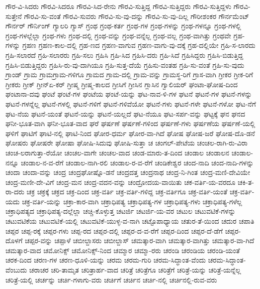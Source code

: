 {ಗೌರ-ವಿ-ಸಿದರು
ಗೌರವಿ-ಸಿದರೂ
ಗೌರವಿ-ಸಿದ-ರೇನು
ಗೌರವಿ-ಸುತ್ತಿದ್ದ
ಗೌರವಿ-ಸುತ್ತಿದ್ದರು
ಗೌರವಿ-ಸುತ್ತಿದ್ದಳು
ಗೌರವಿ-ಸುತ್ತೇನೆ
ಗೌರವಿ-ಸು-ವಂತೆ
ಗೌರವಿ-ಸುವರು
ಗೌರವಿ-ಸು-ವು-ದನ್ನು
ಗೌರವಿ-ಸು-ವು-ದಿಲ್ಲ
ಗೌರೀಶಂಕರ
ಗೌರ್ನಮೆಂಟ್
ಗೌರ್ನರ್
ಗೌರ್ನಿಂಗ್
ಗ್ಯಾಲರಿ
ಗ್ಯಾಸ್
ಗ್ರಂಥ
ಗ್ರಂಥ-ಕರ್ತ
ಗ್ರಂಥ-ಗಳ
ಗ್ರಂಥ-ಗಳನ್ನು
ಗ್ರಂಥ-ಗಳನ್ನೂ
ಗ್ರಂಥ-ಗಳಲ್ಲಿ
ಗ್ರಂಥ-ಗಳಲ್ಲೆಲ್ಲಾ
ಗ್ರಂಥ-ಗಳು
ಗ್ರಂಥ-ದಲ್ಲಿ
ಗ್ರಂಥ-ವನ್ನು
ಗ್ರಂಥ-ವನ್ನೆಲ್ಲ
ಗ್ರಂಥ-ವಲ್ಲ
ಗ್ರಂಥ-ವಾಗಿತ್ತು
ಗ್ರಂಥವೇ
ಗ್ರಹ-ಗಳನ್ನು
ಗ್ರಹಣ
ಗ್ರಹಣ-ಕಾಲ-ದಲ್ಲಿ
ಗ್ರಹ-ಣದ
ಗ್ರಹಣ-ವಾಗುವ
ಗ್ರಹಣ-ವಾಗು-ವು-ದಕ್ಕೆ
ಗ್ರಹ-ದಲ್ಲಿಯೇ
ಗ್ರಹಿ-ಸ-ಲಾರದು
ಗ್ರಹಿ-ಸಲಾರದೆ
ಗ್ರಹಿ-ಸಲಾರರು
ಗ್ರಹಿ-ಸಲು
ಗ್ರಹಿಸಿ
ಗ್ರಹಿ-ಸಿದ
ಗ್ರಹಿಸಿ-ದರು
ಗ್ರಹಿ-ಸಿದೆ
ಗ್ರಹಿಸಿದ್ದರು
ಗ್ರಹಿಸಿ-ಬಿಡುತ್ತಿದ್ದ
ಗ್ರಹಿಸಿ-ಬಿಡುತ್ತಿದ್ದರು
ಗ್ರಹಿಸಿ-ರು-ವು-ದಾಗಿಯೂ
ಗ್ರಹಿ-ಸುತ್ತ-ದೆಯೆ
ಗ್ರಹಿಸು-ವಂತಹ
ಗ್ರಹಿ-ಸು-ವಂತೆ
ಗ್ರಹಿ-ಸು-ವುದು
ಗ್ರಾಂಡ್
ಗ್ರಾಮ
ಗ್ರಾಮಗ್ರಾಮ-ಗಳಿಗೂ
ಗ್ರಾಮದ
ಗ್ರಾಮ-ದಲ್ಲಿ
ಗ್ರಾಮ-ವನ್ನು
ಗ್ರಾಮಸ್ಥ-ರಿಗೆ
ಗ್ರಾಸ-ವಾಗಿ
ಗ್ರೀಕರ
ಗ್ರೀಕ-ರಿಗೆ
ಗ್ರೀಕರು
ಗ್ರೀಕ್
ಗ್ರೀನ್ಏ-ಕರ್
ಗ್ರೀಷ್ಮ
ಗ್ರೀಷ್ಮ-ಕಾಲದ
ಗ್ರೀಸಿಗೆ
ಗ್ರೀಸಿನ
ಗ್ಲಾಸಿನ
ಗ್ವಾಲಿಯರ್
ಘಂಟಾ-ಘೋಷ-ದಿಂದ
ಘಂಟಾನಾ-ದವು
ಘಂಟೆ
ಘಂಟೆ-ಗಳ
ಘಂಟೆಯ
ಘಂಟೆ-ಯನ್ನು
ಘಟ-ನಾವ-ಳಿ-ಗಳ
ಘಟನೆ
ಘಟನೆ-ಗಳ
ಘಟನೆ-ಗಳನ್ನು
ಘಟನೆ-ಗಳನ್ನೆಲ್ಲ
ಘಟನೆ-ಗಳಲ್ಲಿ
ಘಟನೆ-ಗಳಿಗೆ
ಘಟನೆ-ಗಳಿವೆಯೋ
ಘಟನೆ-ಗಳು
ಘಟನೆ-ಗಳೇ
ಘಟನೆ-ಗಳೋ
ಘಟ-ನೆಗೆ
ಘಟ-ನೆಯ
ಘಟನೆ-ಯಂತೆ
ಘಟನೆ-ಯನ್ನು
ಘಟನೆ-ಯಲ್ಲದೆ
ಘಟ-ನೆಯೂ
ಘಟ-ಸರ್ಪ-ವನ್ನು
ಘಟ್ಟಕ್ಕೆ
ಘನ
ಘನದ
ಘನೀ-ಭೂತ-ವಾಗಿ
ಘನೀ-ಭೂತ-ವಾದ
ಘರೆ
ಘರ್ಷಣೆ
ಘರ್ಷಣೆ-ಗಳಿಂದ
ಘರ್ಷಣೆ-ಗಳು
ಘರ್ಷಣೆಯ
ಘರ್ಷಣೆ-ಯಲ್ಲಿ
ಘಳಿಗೆ
ಘಾಟಿಗೆ
ಘಾಟಿ-ನಲ್ಲಿ
ಘಾಟಿ-ನಿಂದ
ಘೋರ-ಧರ್ಮ
ಘೋರ-ವಾ-ಗಿದೆ
ಘೋಷ
ಘೋಷ-ಜರೆ
ಘೋಷ-ದೊ-ಡನೆ
ಘೋಷರು
ಘೋಷರೇ
ಘೋಷಾ
ಘೋಷಿ-ಸಿದುವು
ಘೋಷಿ-ಸುತ್ತಾ
ಚ
ಚಂಗಲ್-ಪೇಟೆಯ
ಚಂಚಲ-ರಾಗಿ-ರು-ವಿರಾ
ಚಂಚ-ಲರಾಗುತ್ತಾ-ರೆಯೋ
ಚಂಚಲ-ವಾಗೇ
ಚಂಚಲ-ವಾದ
ಚಂಡ-ಮಾರು-ತ-ದಿಂದ
ಚಂಡಾಲ
ಚಂಡಾಲನ
ಚಂಡಾಲ-ನನ್ನೂ
ಚಂಡಾಲ-ನ-ವ-ರೆಗೆ
ಚಂಡಾಲ-ನಾಗಿ-ರಲಿ
ಚಂಡಾಲ-ರ-ವ-ರೆಗೆ
ಚಂಡಿಕೇಶ್ವರ
ಚಂದ-ನಾದಿ
ಚಂದ-ನಾದಿ-ಗಳನ್ನು
ಚಂದಾ
ಚಂದಾ-ವನ್ನು
ಚಂದ್ರ
ಚಂದ್ರಘೋಷ್ನೊ-ಡನೆ
ಚಂದ್ರದತ್ತ
ಚಂದ್ರನಾಥ
ಚಂದ್ರ-ನಿ-ಗಿಂತ
ಚಂದ್ರ-ಮಣಿ-ದೇವಿಯೇ
ಚಂದ್ರ-ಮಣೀ-ದೇ-ವಿಗೆ
ಚಂದ್ರ-ಮನ
ಚಂದ್ರ-ವದನ-ವನ್ನು
ಚಂದ್ರೋದಯ-ವಾಯಿತು
ಚಕ-ವರ್ತಿ-ಯ-ವರದೂ
ಚಕಿ-ತ-ರಾ-ದರು
ಚಕ್ರ
ಚಕ್ರಕ್ಕೆ
ಚಕ್ರದ
ಚಕ್ರ-ದಿಂದ
ಚಕ್ರ-ವರ್ತಿ
ಚಕ್ರ-ವರ್ತಿ-ಗಳಿದ್ದ
ಚಕ್ರ-ವರ್ತಿಗೂ
ಚಕ್ರ-ವರ್ತಿ-ಯಂತೆ
ಚಕ್ರ-ವರ್ತಿ-ಯದು
ಚಕ್ರ-ವರ್ತಿ-ಯನ್ನು
ಚಕ್ರಾ-ಕಾರ-ವಾಗಿ
ಚಕ್ರಾಧಿಪತ್ಯ
ಚಕ್ರಾಧಿಪತ್ಯ-ಗಳ
ಚಕ್ರಾಧಿಪತ್ಯ-ಗಳು
ಚಕ್ರಾಧಿಪತ್ಯ-ಗಳೆಲ್ಲ
ಚಕ್ರಾಧಿಪತ್ಯದ
ಚಕ್ರಾಧಿಪತ್ಯ-ದಲ್ಲೆಲ್ಲಾ
ಚಚ್ಚಿ-ಕೊಳ್ಳುತ್ತ
ಚಟರ್ಜಿ
ಚಟರ್ಜಿ-ಯ-ವರ
ಚಟುಲ
ಚಟುವಟಿಕೆ-ಗಳನ್ನು
ಚಟುವಟಿಕೆಯ
ಚಟುವಟಿಕೆ-ಯಲ್ಲಿ
ಚಟುವಟಿಕೆ-ಯುಳ್ಳ-ವ-ನಾಗಿ
ಚಟ್ಟೊಪಾಧ್ಯಾಯ
ಚತುರ-ತೆ-ಯಿಂದ
ಚದುರ
ಚಪಾತಿ
ಚಪ್ಪರ
ಚಪ್ಪ-ರಕ್ಕೆ
ಚಪ್ಪರ-ಗಳು
ಚಪ್ಪ-ರದ
ಚಪ್ಪರ-ದಲ್ಲಿ
ಚಪ್ಪರ-ದ-ವ-ರೆಗೆ
ಚಪ್ಪರ-ದಿಂದ
ಚಪ್ಪರ-ದೆ-ಡೆಗೆ
ಚಪ್ಪರ-ದೊಳಗೆ
ಚಪ್ಪರ-ವನ್ನು
ಚಪ್ಪಾಳೆ
ಚಬೀಲ್ದಾಸರು
ಚಬೀಲ್ದಾಸ್
ಚಮತ್ಕಾರ-ವಾಗಿ
ಚಮತ್ಕಾರ-ವಾಗಿತ್ತು
ಚಮತ್ಕಾರ-ವಾ-ಗಿದೆ
ಚಮತ್ಕಾರ-ವಾದ
ಚಮೋನಿಕ್ಸ್
ಚಮೋನಿಕ್ಸ್-ನಿಂದ
ಚಮ್ಮಾರ
ಚಮ್ಮಾ-ರರು
ಚರಂಡಿ
ಚರಂಡಿಯ
ಚರಂಡಿ-ಯಂತೆ
ಚರಕ-ದಿಂದ
ಚರಣ-ಗಳ
ಚರಣ-ಧೂಳಿ-ಯನ್ನು
ಚರಮ
ಚರಮ-ಗುರಿ
ಚರಮ-ಸಿದ್ಧಾಂತ-ವೆಂದು
ಚರಮ-ಸಿದ್ಧಾಂತ-ವೆಂಬುದು
ಚರಾಚರ
ಚರಿ-ತಾಮೃತ
ಚರಿತ್ರಾರ್ಹ-ವಾದ
ಚರಿತ್ರೆ
ಚರಿತ್ರೆಗೂ
ಚರಿತ್ರೆಗೆ
ಚರಿತ್ರೆ-ಯನ್ನು
ಚರಿತ್ರೆ-ಯನ್ನೆಲ್ಲ
ಚರಿತ್ರೆ-ಯಲ್ಲಿ
ಚರ್ಚನ್ನು
ಚರ್ಚಿ-ಗಳಾಗು-ವರು
ಚರ್ಚಿಗೆ
ಚರ್ಚಿನ
ಚರ್ಚಿ-ನಲ್ಲಿ
ಚರ್ಚಿನಲ್ಲಿ-ರುವ-ವರು
}
